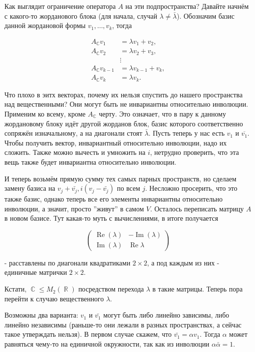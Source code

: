 \documentclass[a4paper,100pt]{article}
\theoremstyle{indented}
\theoremstyle{definition}
\theoremstyle{remark}
\DeclareMathOperator{\Imf}{Im}
\DeclareMathOperator{\CC}{\mathbb{C}}
\DeclareMathOperator{\RR}{\mathbb{R}}
\DeclareMathOperator{\Real}{Re}
\begin{document}
Как выглядит ограничение оператора $A$ на эти подпространства? Давайте начнём с какого-то жорданового блока (для начала, случай $\lambda\neq \bar{\lambda}$). Обозначим базис данной жордановой формы $v_1, \ldots, v_k$, тогда 

\begin{align*}
    A_{\CC}v_1&=\lambda v_1+v_2, \\
    A_{\CC}v_2&=\lambda v_2+v_3, \\
    &\vdots \\
    A_{\CC}v_{k-1}&=\lambda v_{k-1}+v_k, \\
    A_{\CC}v_k&=\lambda v_k.
\end{align*}

Что плохо в эитх векторах, почему их нельзя спустить до нашего пространства над вещественными? Они могут быть не инвариантны относительно инволюции. Применим ко всему, кроме $A_{\CC}$ черту. Это означает, что в пару к данному жордановому блоку идёт другой жорданов блок, базис которого соответственно сопряжён изначальному, а на диагонали стоят $\bar{\lambda}$. Пусть теперь у нас есть $v_1$ и $\overline{v_1}$. Чтобы получить вектор, инвариантный относительно инволюции, надо их сложить. Также можно вычесть и умножить на $i$, нетрудно проверить, что эта вещь также будет инвариантна относительно инволюции. \ 

И теперь возьмём прямую сумму тех самых парных пространств, но сделаем замену базиса на $v_j+\bar{v_j}, i(v_j-\bar{v_j})$ по всем $j$. Несложно просерить, что это также базис, однако теперь все его элементы инвариантны относительно инволюции, а значит, просто ''живут'' в самом $V$. Осталось переписать матрицу $A$ в новом базисе. Тут какая-то муть с вычислениями, в итоге получается

\begin{equation*}
    \begin{pmatrix}
        \Real(\lambda) & -\Imf(\lambda) \\
        \Imf(\lambda) & \Real{\lambda}
    \end{pmatrix}
\end{equation*}

- расставлены по диагонали квадратиками $2\times 2$, а под каждым из них - единичные матрички $2\times2$. \ 

Кстати, $\CC\leq M_2(\RR)$ посредством перехода $\lambda$ в такие матрицы. Теперь пора перейти к случаю вещественного $\lambda$. \ 

Возможны два варианта: $v_1$ и $\bar{v_1}$ могут быть либо линейно зависимы, либо линейно независимы (раньше-то они лежали в разных пространствах, а сейчас такое утверждать нельзя). В первом случае скажем, что $\bar{v_1}=\alpha v_1$. Тогда $\alpha$ может равняться чему-то на единичной окружности, так как из инволюции $\alpha \bar{\alpha}=1$. \\
\end{document}
